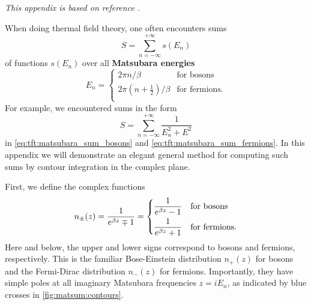 \textit{This appendix is based on reference \cite{ref:altland_simons}.}

When doing thermal field theory, one often encounters sums
\begin{equation}
	S = \sum_{n=-\infty}^{+\infty} s(E_n)
\label{eq:matsum:sum}
\end{equation}
of functions $s(E_n)$ over all \textbf{Matsubara energies}
\begin{equation}
	E_n = \begin{cases}
	          2 \pi n / \beta                        & \text{for bosons}    \\
	          2 \pi \left( n+\frac12 \right) / \beta & \text{for fermions} .\\
	      \end{cases}
\end{equation}
For example, we encountered sums in the form
\begin{equation}
	S = \sum_{n=-\infty}^{+\infty} \frac{1}{E_n^2 + E^2}
\label{eq:matsum:motivating_example}
\end{equation}
in \cref{eq:tft:matsubara_sum_bosons} and \cref{eq:tft:matsubara_sum_fermions}.
In this appendix we will demonstrate an elegant general method for computing such sums by contour integration in the complex plane.

First, we define the complex functions
\begin{equation}
	n_\pm(z) = \frac{1}{e^{\beta z} \mp 1}
	         = \begin{dcases}
		           \displaystyle \frac{1}{e^{\beta z} - 1} & \text{for bosons}     \\
		           \displaystyle \frac{1}{e^{\beta z} + 1} & \text{for fermions} . \\
	           \end{dcases}
\label{eq:matsum:distribution}
\end{equation}
Here and below, the upper and lower signs correspond to bosons and fermions, respectively.
This is the familiar Bose-Einstein distribution $n_+(z)$ for bosons and the Fermi-Dirac distribution $n_-(z)$ for fermions.
Importantly, they have simple poles at all imaginary Matsubara frequencies $z = i E_n$, as indicated by blue crosses in \cref{fig:matsum:contours}.

\usetikzlibrary{decorations.markings}
\usetikzlibrary{shapes.misc}

